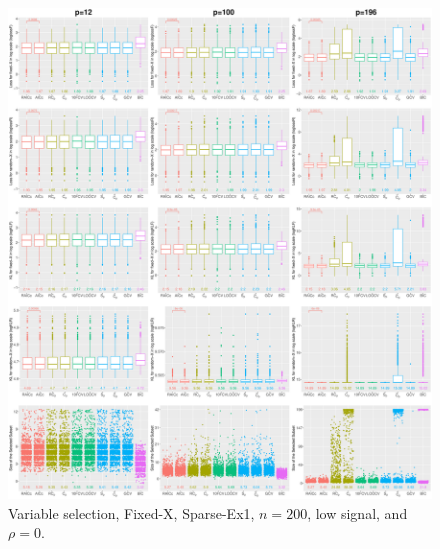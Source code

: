 \begin{figure}[!ht]
\centering
\includegraphics[width=\textwidth]{figures/supplement/fixedx/subset_selection/Sparse-Ex1_n200_lsnr_rho0.eps}
\caption{Variable selection, Fixed-X, Sparse-Ex1, $n=200$, low signal, and $\rho=0$.}
\end{figure}
\clearpage
